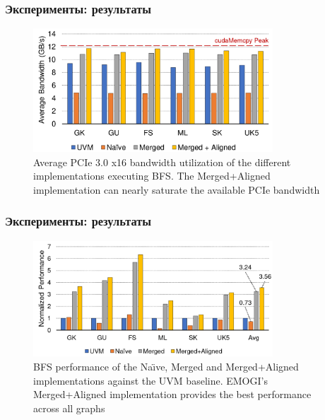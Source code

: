 \documentclass[xcolor=table,english]{beamer}
\begin{document}
\begin{frame}[fragile] \frametitle{Эксперименты: результаты}
     \begin{center}
    \begin{minipage}[m]{0.95\linewidth}
        \begin{figure}
            \centering
            \includegraphics[width=0.8\textwidth]{figures/bandwidth.png}
            \caption{Average PCIe 3.0 x16 bandwidth utilization of the different implementations executing BFS. The Merged+Aligned implementation can nearly saturate the available PCIe bandwidth}
        \end{figure}
    \end{minipage}\hfill
    \end{center}
\end{frame}

\begin{frame}[fragile] \frametitle{Эксперименты: результаты}
     \begin{center}
    \begin{minipage}[m]{0.95\linewidth}
        \begin{figure}
            \centering
            \includegraphics[width=0.8\textwidth]{figures/performance.png}
            \caption{BFS performance of the Na\"{\i}ve, Merged and Merged+Aligned implementations  against the UVM baseline. EMOGI’s Merged+Aligned implementation provides the best performance across all graphs}
        \end{figure}
    \end{minipage}\hfill
    \end{center}
\end{frame}
\end{document}
